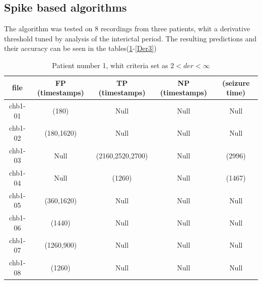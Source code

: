 



\subsection{Spike based algorithms}
The algorithm was tested on 8 recordings from three patients, whit a derivative threshold tuned by analysis of the interictal period. The resulting predictions and their accuracy can be seen in the tables(\ref{Der1}-\ref{Der3})



\begin{table}[H]
\centering
    \begin{tabular}{c | c |c |c | c}
        \hline
         file &  FP (timestamps) & TP (timestamps) & NP (timestamps) & (seizure time)  \\
        \hline
        chb1-01 & (180) & Null & Null & Null   \\
        chb1-02 & (180,1620) & Null & Null & Null \\
        chb1-03 & Null & (2160,2520,2700) & Null & (2996)
        \\
        chb1-04	&  Null &   (1260) & Null & (1467)\\
        chb1-05 &   (360,1620) & Null & Null & Null\\
        chb1-06 &   (1440) & Null & Null & Null\\
        chb1-07 &   (1260,900) & Null & Null & Null  \\
        chb1-08 &   (1260) & Null & Null & Null  \\
        \hline
     \end{tabular} 
\caption{Patient number 1, whit criteria set as $2< der < \infty$ }
\label{Der1}
\end{table}

